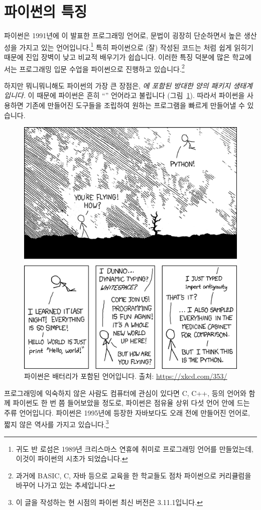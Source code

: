 \documentclass[../main.tex]{subfiles}
\begin{document}
\section{파이썬의 특징}
파이썬은 1991년에 이 발표한 프로그래밍 언어로, 문법이 굉장히 단순하면서 높은 생산성을 가지고 있는 언어입니다.\footnote{귀도 반 로섬은 1989년 크리스마스 연휴에 취미로 프로그래밍 언어를 만들었는데, 이것이 파이썬의 시초가 되었습니다.}
특히 파이썬으로 (잘) 작성된 코드는 처럼 쉽게 읽히기 때문에 진입 장벽이 낮고 비교적 배우기가 쉽습니다.
이러한 특징 덕분에 많은 학교에서는 프로그래밍 입문 수업을 파이썬으로 진행하고 있습니다.\footnote{과거에 BASIC, C, 자바 등으로 교육을 한 학교들도 점차 파이썬으로 커리큘럼을 바꾸어 나가고 있는 추세입니다.}

하지만 뭐니뭐니해도 파이썬의 가장 큰 장점은, \emph{에 포함된 방대한 양의 패키지 생태계입니다.}
이 때문에 파이썬은 흔히 ``'' 언어라고 불립니다 (그림~\ref{fig:meme}).
따라서 파이썬을 사용하면 기존에 만들어진 도구들을 조립하여 원하는 프로그램을 빠르게 만들어낼 수 있습니다.

\begin{figure}[htbp]
  \centering
  \includegraphics[width=0.7\linewidth]{./figures/xkcd_python}
  \caption{파이썬은 배터리가 포함된 언어입니다. 출처: \url{https://xkcd.com/353/}}\label{fig:meme}
\end{figure}

프로그래밍에 익숙하지 않은 사람도 컴퓨터에 관심이 있다면 C, C++,  등의 언어와 함께 파이썬도 한 번 쯤 들어보았을 정도로, 파이썬은 점유율 상위 다섯 언어 안에 드는 주류 언어입니다.
파이썬은 1995년에 등장한 자바보다도 오래 전에 만들어진 언어로, 짧지 않은 역사를 가지고 있습니다.\footnote{이 글을 작성하는 현 시점의 파이썬 최신 버전은 3.11.1입니다.}
\end{document}
